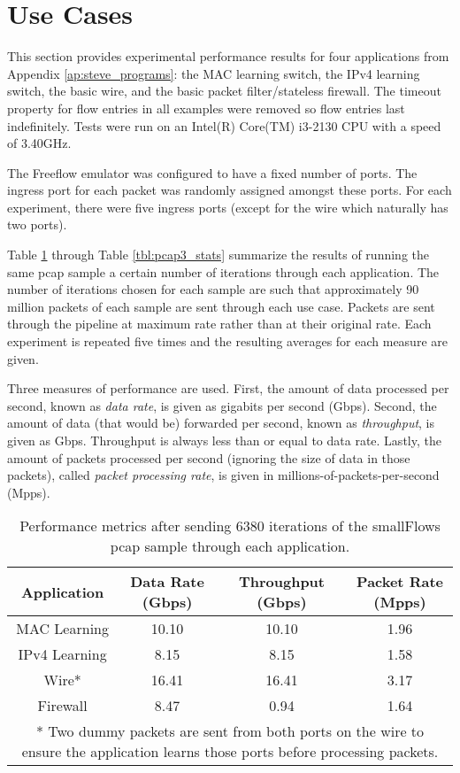 \section{Use Cases}

This section provides experimental performance results for four applications from Appendix \ref{ap:steve_programs}: the MAC learning switch, the IPv4 learning switch, the basic wire, and the basic packet filter/stateless firewall. The timeout property for flow entries in all examples were removed so flow entries last indefinitely. Tests were run on an Intel(R) Core(TM) i3-2130 CPU with a speed of 3.40GHz.

The Freeflow emulator was configured to have a fixed number of ports. The ingress port for each packet was randomly assigned amongst these ports. For each experiment, there were five ingress ports (except for the wire which naturally has two ports). 

Table \ref{tbl:pcap1_stats} through Table \ref{tbl:pcap3_stats} summarize the results of running the same pcap sample a certain number of iterations through each application. The number of iterations chosen for each sample are such that approximately 90 million packets of each sample are sent through each use case. Packets are sent through the pipeline at maximum rate rather than at their original rate. Each experiment is repeated five times and the resulting averages for each measure are given.

Three measures of performance are used. First, the amount of data processed per second, known as \textit{data rate}, is given as gigabits per second (Gbps). Second, the amount of data (that would be) forwarded per second, known as \textit{throughput}, is given as Gbps. Throughput is always less than or equal to data rate. Lastly, the amount of packets processed per second (ignoring the size of data in those packets), called \textit{packet processing rate}, is given in millions-of-packets-per-second (Mpps).

\begin{table}
\caption{Performance metrics after sending 6380 iterations of the smallFlows pcap sample through each application.}
\begin{center}
\begin{tabularx}{0.9\textwidth}{| c || c | c | c |}
\hline
Application & Data Rate (Gbps) & Throughput (Gbps) & Packet Rate (Mpps)  \\
\hline
MAC Learning & 10.10 & 10.10 & 1.96  \\
\hline
IPv4 Learning & 8.15 & 8.15 & 1.58  \\
\hline 
Wire* & 16.41 & 16.41 & 3.17 \\
\hline
Firewall & 8.47 & 0.94 & 1.64 \\
\hline
\multicolumn{4}{p{0.9\textwidth}}{* Two dummy packets are sent from both ports on the wire to ensure the application learns those ports before processing packets.}
\end{tabularx}
\end{center}
\label{tbl:pcap1_stats}
\end{table}


